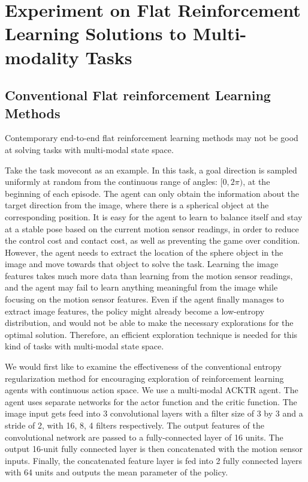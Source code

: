 
\section{Experiment on Flat Reinforcement Learning Solutions to Multi-modality Tasks}
\subsection{Conventional Flat reinforcement Learning Methods}\label{sec_multi_modal_flat}
Contemporary end-to-end flat reinforcement learning methods may not be good at solving tasks with multi-modal state space. 

Take the task movecont as an example. In this task, a goal direction is sampled uniformly at random from the continuous range of angles: $[0,2\pi)$, at the beginning of each episode. The agent can only obtain the information about the target direction from the image, where there is a spherical object at the corresponding position. It is easy for the agent to learn to balance itself and stay at a stable pose based on the current motion sensor readings, in order to reduce the control cost and contact cost, as well as preventing the game over condition. However, the agent needs to extract the location of the sphere object in the image and move towards that object to solve the task. Learning the image features takes much more data than learning from the motion sensor readings, and the agent may fail to learn anything meaningful from the image while focusing on the motion sensor features. Even if the agent finally manages to extract image features, the policy might already become a low-entropy distribution, and would not be able to make the necessary explorations for the optimal solution. Therefore, an efficient exploration technique is needed for this kind of tasks with multi-modal state space.

We would first like to examine the effectiveness of the conventional entropy regularization method for encouraging exploration of reinforcement learning agents with continuous action space. We use a multi-modal ACKTR agent. The agent uses separate networks for the actor function and the critic function. The image input gets feed into 3 convolutional layers with a filter size of 3 by 3 and a stride of 2, with 16, 8, 4 filters respectively. The output features of the convolutional network are passed to a fully-connected layer of 16 units. The output 16-unit fully connected layer is then concatenated with the motion sensor inputs. Finally, the concatenated feature layer is fed into 2 fully connected layers with 64 units and outputs the mean parameter of the policy. 

